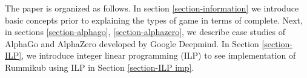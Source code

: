 \documentclass[11pt]{article}
\newcommand{\rr}{\mathbb{R}}
\newcommand{\al}{\alpha}
\DeclareMathOperator{\conv}{conv}
\begin{document}
	
	The paper is organized as follows. In section \ref{section-information} we introduce basic concepts prior to explaining the types of game in terms of complete. Next, in sections \ref{section-alphago}, \ref{section-alphazero}, we describe case studies of AlphaGo and AlphaZero developed by Google Deepmind. In Section \ref{section-ILP}, we introduce integer linear programming (ILP) to see implementation of Rummikub using ILP in Section \ref{section-ILP imp}.
	
	
	
	
\end{document}
